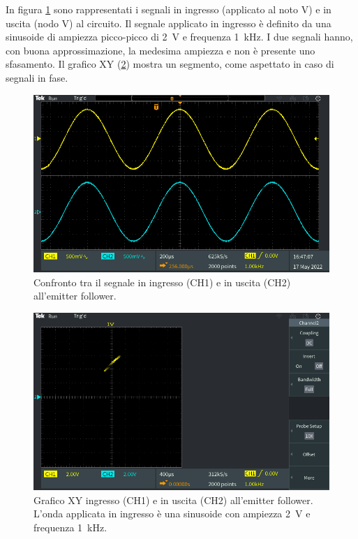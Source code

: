 \noindent
In figura \ref{fig:emitterfollwer_v2_AC} sono rappresentati i segnali in ingresso (applicato al noto V) e in uscita (nodo V) al circuito. Il segnale applicato in ingresso è definito da una sinusoide di ampiezza picco-picco di \SI{2}{\volt} e frequenza \SI{1}{\kilo\hertz}. I due segnali hanno, con buona approssimazione, la medesima ampiezza e non è presente uno sfasamento. Il grafico XY (\Fig\ref{fig:emitterfollwer_v2_XY}) mostra un segmento, come aspettato in caso di segnali in fase.
\begin{figure}[h!]
	\centering
	\includegraphics[width=0.8\linewidth]{./ImageFiles/Laboratorio 2/TEK00023}
	\caption{Confronto tra il segnale in ingresso (CH1) e in uscita (CH2) all'emitter follower.}
	\label{fig:emitterfollwer_v2_AC}
\end{figure}
\begin{figure}[h!]
	\centering
	\includegraphics[width=0.8\linewidth]{./ImageFiles/Laboratorio 3/TEK00001}
	\caption{Grafico XY ingresso (CH1) e in uscita (CH2) all'emitter follower. L'onda applicata in ingresso è una sinusoide con ampiezza \SI{2}{\volt} e frequenza \SI{1}{\kilo\hertz}.}
	\label{fig:emitterfollwer_v2_XY}
\end{figure}